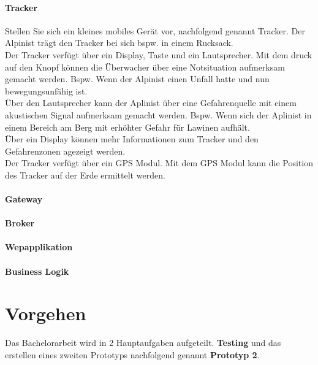 \documentclass[11pt,english,german]{report}
\theoremstyle{definition}
\begin{document}
\subsubsection{Tracker}
Stellen Sie sich ein kleines mobiles Gerät vor, nachfolgend genannt Tracker. Der Alpinist trägt den Tracker bei sich bspw. in einem Rucksack.\\ \bigskip
Der Tracker verfügt über ein Display, Taste und ein Lautsprecher. Mit dem druck auf den Knopf können die Überwacher über eine Notsituation aufmerksam gemacht werden. Bspw. Wenn der Alpinist einen Unfall hatte und nun bewegungsunfähig ist.\\ \bigskip
Über den Lautsprecher kann der Aplinist über eine Gefahrenquelle mit einem akustischen Signal aufmerksam gemacht werden. Bspw. Wenn sich der Aplinist in einem Bereich am Berg mit erhöhter Gefahr für Lawinen aufhält. \\ \bigskip
Über ein Display können mehr Informationen zum Tracker und den Gefahrenzonen agezeigt werden. \\ \bigskip
Der Tracker verfügt über ein GPS Modul. Mit dem GPS Modul kann die Position des Tracker auf der Erde ermittelt werden.

\subsubsection{Gateway}

\subsubsection{Broker}

\subsubsection{Wepapplikation}

\subsubsection{Business Logik}

\chapter{Vorgehen}
Das Bachelorarbeit wird in 2 Hauptaufgaben aufgeteilt.\textbf{ Testing} und das erstellen eines zweiten Prototyps nachfolgend genannt \textbf{Prototyp 2}.
\end{document}
